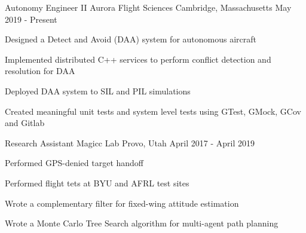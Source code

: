 

\begin{cventries}

  \cventry
    {Autonomy Engineer II} %
    {Aurora Flight Sciences} %
    {Cambridge, Massachusetts} %
    {May 2019 - Present} %
    {
      \begin{cvitems}
      \item{Designed a Detect and Avoid (DAA) system for autonomous aircraft}
      \item{Implemented distributed C++ services to perform conflict detection and resolution for DAA}
      \item{Deployed DAA system to SIL and PIL simulations}
      \item{Created meaningful unit tests and system level tests using GTest, GMock, GCov and Gitlab}
      \end{cvitems}
    }

  \cventry
    {Research Assistant} %
    {Magicc Lab} %
    {Provo, Utah} %
    {April 2017 - April 2019} %
    {
      \begin{cvitems} %
      \item{Performed GPS-denied target handoff}
      \item{Performed flight tets at BYU and AFRL test sites}
      \item{Wrote a complementary filter for fixed-wing attitude estimation}
      \item{Wrote a Monte Carlo Tree Search algorithm for multi-agent path planning}
      \end{cvitems}
    }



\end{cventries}
